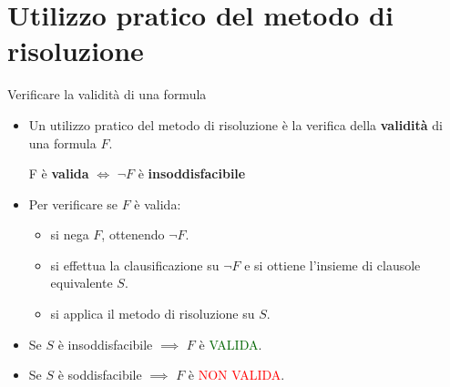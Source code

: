 \documentclass{beamer}
\begin{document}
\section{Utilizzo pratico del metodo di risoluzione}

\begin{frame}{Verificare la validità di una formula}
    \begin{itemize}
        \item Un utilizzo pratico del metodo di risoluzione è la verifica della \textbf{validità} di una formula $F$.
        \begin{center}
            F è \textbf{valida} $\iff$ $\lnot F$ è \textbf{insoddisfacibile}
        \end{center}
        \vspace{5px}
        \item Per verificare se $F$ è valida:
        \begin{itemize}
            \item si nega $F$, ottenendo $\lnot F$.
            \item si effettua la clausificazione su $\lnot F$ e si ottiene l'insieme di clausole equivalente $S$.
            \item si applica il metodo di risoluzione su $S$.
        \end{itemize}
        \item Se $S$ è insoddisfacibile $\implies$ $F$ è \textcolor{darkgreen}{VALIDA}.
        \item Se $S$ è soddisfacibile $\implies$ $F$ è \textcolor{red}{NON VALIDA}.
    \end{itemize}
\end{frame}
\end{document}
